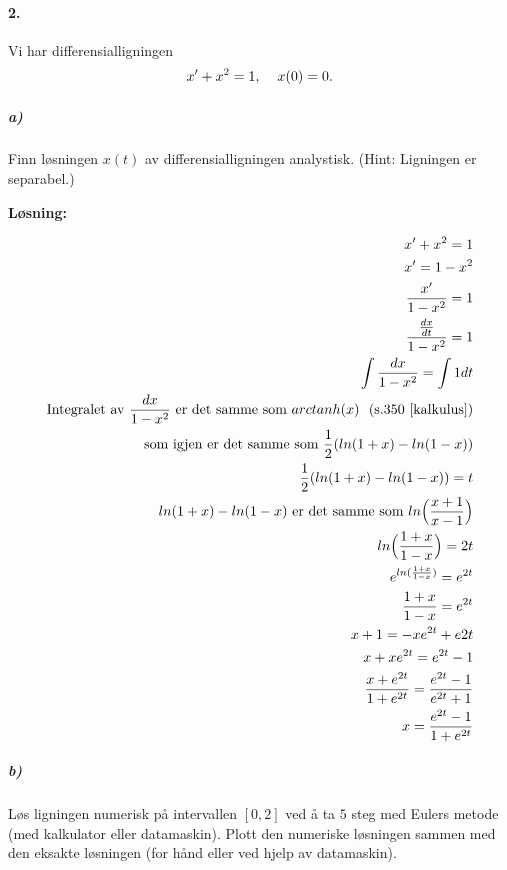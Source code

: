 \documentclass[11pt,norsk]{article}
\begin{document}
		\paragraph{2.}
			\begin{flushleft}
Vi har differensialligningen
				\begin{align}\label{eq:difflig}
x' + x^2 = 1, \hspace{4mm} x(0) = 0.
				\end{align}
			\end{flushleft}
			\subparagraph{a)}
				\begin{flushleft}
Finn løsningen $x(t)$ av differensialligningen analystisk. (Hint: Ligningen er separabel.)
				\end{flushleft}
				\begin{flushleft}
\textbf{Løsning:}
				\end{flushleft}
				\begin{align}
x' + x^2 = 1 \\
x' = 1 - x^2 \\
\dfrac{x'}{1 - x^2} = 1 \\
\dfrac{\frac{dx}{dt}}{1 - x^2} = 1 \\
\int{\dfrac{dx}{1 - x^2}} = \int{1 dt} \\
\text{Integralet av $\frac{dx}{1 - x^2}$ er det samme som $arctanh(x)$ \hspace{0.01mm} (s.350 \cite{kalkulus})} \\
\text{som igjen er det samme som $\frac{1}{2}(ln(1 + x) - ln(1 - x))$} \nonumber \\
\dfrac{1}{2}(ln(1 + x) - ln(1 - x)) = t \\
\text{$ln(1 + x) - ln(1 - x)$ er det samme som $ln\Big{(}\frac{x + 1}{x - 1}\Big{)}$} \\
ln\Big{(}\frac{1 + x}{1 - x}\Big{)} = 2t \\
e^{ln(\frac{1 + x}{1 - x})} = e^{2t} \\
\dfrac{1 + x}{1 - x} = e^{2t} \\
x + 1 = - xe^{2t} + e{2t} \\
x + xe^{2t} = e^{2t} - 1 \\
\dfrac{x + e^{2t}}{1 + e^{2t}} = \dfrac{e^{2t} - 1}{e^{2t} + 1} \\
x = \dfrac{e^{2t} - 1}{1 + e^{2t}} 
				\end{align}
			\subparagraph{b)}
				\begin{flushleft}
Løs ligningen numerisk på intervallen $[0,2]$ ved å ta $5$ steg med Eulers metode (med kalkulator eller datamaskin). Plott den numeriske løsningen sammen med den eksakte løsningen (for hånd eller ved hjelp av datamaskin). 
				\end{flushleft}
\end{document}
